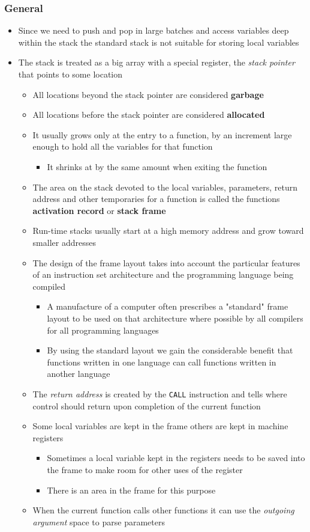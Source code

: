 \documentclass[11pt]{article}
\begin{document}
\subsubsection{General}
\label{sec:org0994ae9}
\begin{itemize}
\item Since we need to push and pop in large batches and access variables deep within the stack the standard stack is not suitable for storing local variables
\item The stack is treated as a big array with a special register, the \emph{stack pointer} that points to some location
\begin{itemize}
\item All locations beyond the stack pointer are considered \textbf{garbage}
\item All locations before the stack pointer are considered \textbf{allocated}
\item It usually grows only at the entry to a function, by an increment large enough to hold all the variables for that function
\begin{itemize}
\item It shrinks at by the same amount when exiting the function
\end{itemize}
\item The area on the stack devoted to the local variables, parameters, return address and other temporaries for a function is called the functions \textbf{activation record} or \textbf{stack frame}
\item Run-time stacks usually start at a high memory address and grow toward smaller addresses
\item The design of the frame layout takes into account the particular features of an instruction set architecture and the programming language being compiled
\begin{itemize}
\item A manufacture of a computer often prescribes a "standard" frame layout to be used on that architecture where possible by all compilers for all programming languages
\item By using the standard layout we gain the considerable benefit that functions written in one language can call functions written in another language
\end{itemize}
\item The \emph{return address} is created by the \texttt{CALL} instruction and tells where control should return upon completion of the current function
\item Some local variables are kept in the frame others are kept in machine registers
\begin{itemize}
\item Sometimes a local variable kept in the registers needs to be saved into the frame to make room for other uses of the register
\item There is an area in the frame for this purpose
\end{itemize}
\item When the current function calls other functions it can use the \emph{outgoing argument} space to parse parameters
\end{itemize}
\end{itemize}
\end{document}
